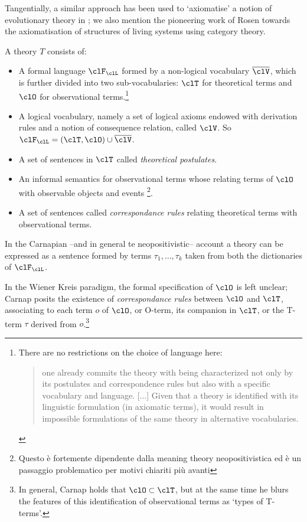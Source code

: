 Tangentially, a similar approach has been used to `axiomatise' a notion of evolutionary theory in \cite{biologia}; we also mention the pioneering work of Rosen \cite{} towards the axiomatisation of structures of living systems using category theory.
\begin{definition} \cite{krause-foundation}
	A theory $T$ consists of:
	\begin{itemize}
	\item A formal language $\clF_\clL$ formed by a non-logical vocabulary $\overline{\clV}$, which is further divided into two sub-vocabularies: $\clT$ for theoretical terms and $\clO$ for observational terms.\footnote{There are no restrictions on the choice of language here:
	\begin{quotation}
		one already commits the theory with being characterized not only by its postulates and correspondence rules but also with a specific vocabulary and language. [...] Given that a theory is identified with its linguistic formulation (in axiomatic terms), it would result in impossible formulations of the same theory in alternative vocabularies. \hspace{\fill}\cite{krause-foundation}
	\end{quotation}}
	\item A logical vocabulary, namely a set of logical axioms endowed with derivation rules and a notion of consequence relation, called $\clV$. So $\clF_\clL= (\clT,\clO) \cup \overline{\clV}$.
	\item A set of sentences in $\clT$ called \emph{theoretical postulates}.
	\item An informal semantics for observational terms whose relating terms of $\clO$ with observable objects and events \footnote{Questo è fortemente dipendente dalla meaning theory neopositivistica \cite{} ed è un passaggio problematico per motivi chiariti più avanti}. 
	\item A set of sentences called \emph{correspondance rules} relating theoretical terms with observational terms. 
	\end{itemize}    
\end{definition}
In the Carnapian --and in general te neopositivistic-- account a theory can be expressed as a sentence formed by terms $\tau_1, \dots, \tau_k$ taken from both the dictionaries of $\clF_\clL$. 

In the Wiener Kreis paradigm, the formal specification of $\clO$ is left unclear; Carnap \cite{carnapfound} posits the existence of \emph{correspondance rules} between $\clO$ and $\clT$, associating to each term $o$ of $\clO$, or O-term, its companion in $\clT$, or the T-term $\tau$ derived from $o$.\footnote{In general, Carnap holds that $\clO \subset \clT$, but at the same time he blurs the features of this identification of observational terms as `types of T-terms'.}

